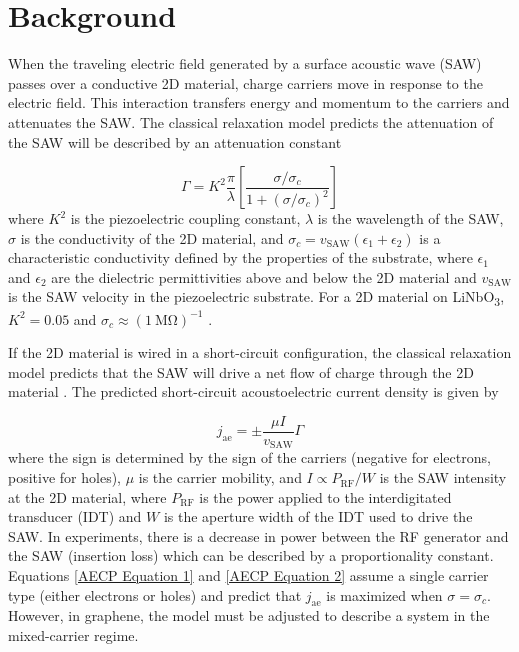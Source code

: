 \documentclass{beavtex_dub_edit}
\begin{document}
\section{Background}

When the traveling electric field generated by a surface acoustic wave (SAW) passes over a conductive 2D material, charge carriers move in response to the electric field. This interaction transfers energy and momentum to the carriers and attenuates the SAW. The classical relaxation model predicts the attenuation of the SAW will be described by an attenuation constant \cite{wixforth_surface_1989}

\begin{equation}
    \Gamma = K^2\frac{\pi}{\lambda}\left[\frac{\sigma/\sigma_c}{1+ (\sigma/\sigma_c)^2}\right]
    \label{AECP Equation 1}
\end{equation}
where $K^2$ is the piezoelectric coupling constant, $\lambda$ is the wavelength of the SAW, $\sigma$ is the conductivity of the 2D material, and $\sigma_c = v_{\mathrm{SAW}}(\epsilon_1 + \epsilon_2)$  is a characteristic conductivity defined by the properties of the substrate, where $\epsilon_1$ and $\epsilon_2$ are the dielectric permittivities above and below the 2D material and $v_{\mathrm{SAW}}$ is the SAW velocity in the piezoelectric substrate. For a 2D material on LiNbO\textsubscript{3}, $K^2= 0.05$ and $\sigma_c \approx (\SI{1}{\mega\ohm})^{-1}$  \cite{wixforth_surface_1989,rotter_giant_1998}.

If the 2D material is wired in a short-circuit configuration, the classical relaxation model predicts that the SAW will drive a net flow of charge through the 2D material \cite{rotter_giant_1998}. The predicted short-circuit acoustoelectric current density is given by

\begin{equation}
    j_{\mathrm{ae}} = \pm \frac{\mu I}{v_{\mathrm{SAW}}}\Gamma
    \label{AECP Equation 2}
\end{equation}
where the sign is determined by the sign of the carriers (negative for electrons, positive for holes), $\mu$ is the carrier mobility, and $I \propto P_{\mathrm{RF}}/W$ is the SAW intensity at the 2D material, where $P_{\mathrm{RF}}$ is the power applied to the interdigitated transducer (IDT) and $W$ is the aperture width of the IDT used to drive the SAW. In experiments, there is a decrease in power between the RF generator and the SAW (insertion loss) which can be described by a proportionality constant. Equations \ref{AECP Equation 1} and \ref{AECP Equation 2} assume a single carrier type (either electrons or holes) and predict that $j_{\mathrm{ae}}$ is maximized when $\sigma = \sigma_c$. However, in graphene, the model must be adjusted to describe a system in the mixed-carrier regime.
\end{document}

